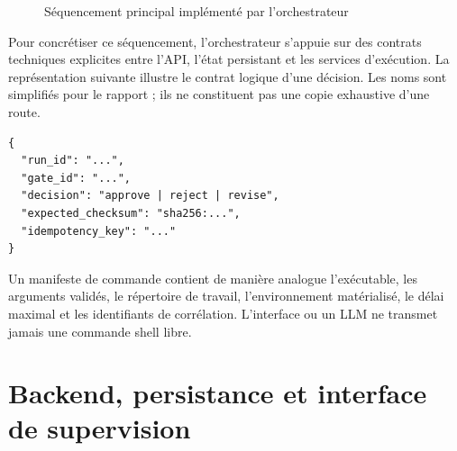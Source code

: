 \begin{figure}[H]
    \centering
    \caption{Séquencement principal implémenté par l'orchestrateur}
    \label{fig:sequencement-orchestrateur-ch4}
\end{figure}

Pour concrétiser ce séquencement, l'orchestrateur s'appuie sur des contrats techniques explicites entre l'API, l'état persistant et les services d'exécution. La représentation suivante illustre le contrat logique d'une décision. Les noms sont simplifiés pour le rapport ; ils ne constituent pas une copie exhaustive d'une route.

\begin{verbatim}
{
  "run_id": "...",
  "gate_id": "...",
  "decision": "approve | reject | revise",
  "expected_checksum": "sha256:...",
  "idempotency_key": "..."
}
\end{verbatim}

Un manifeste de commande contient de manière analogue l'exécutable, les arguments validés, le répertoire de travail, l'environnement matérialisé, le délai maximal et les identifiants de corrélation. L'interface ou un LLM ne transmet jamais une commande shell libre.

\section{Backend, persistance et interface de supervision}


